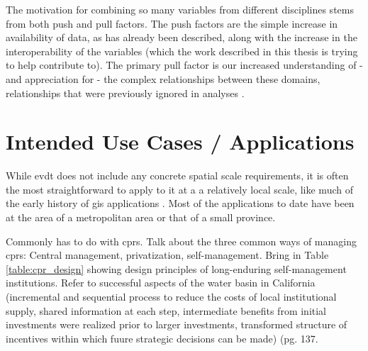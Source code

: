 The motivation for combining so many variables from different disciplines stems from both push and pull factors. The push factors are the simple increase in availability of data, as has already been described, along with the increase in the interoperability of the variables (which the work described in this thesis is trying to help contribute to). The primary pull factor is our increased understanding of - and appreciation for - the complex relationships between these domains, relationships that were previously ignored in analyses \cite{gaheganMultivariateGeovisualization2007}. 

\section{Intended Use Cases / Applications}

While \ac{evdt} does not include any concrete spatial scale requirements, it is often the most straightforward to apply to it at a a relatively local scale, like much of the early history of \ac{gis} applications \cite{tullochInstitutionalGeographicInformation2007}. Most of the applications to date have been at the area of a metropolitan area or that of a small province.





Commonly has to do with \acp{cpr}. Talk about the three common ways of managing \acp{cpr}: Central management, privatization, self-management. Bring in Table \ref{table:cpr_design}  showing design principles of long-enduring self-management institutions. Refer to successful aspects of the water basin in California (incremental and sequential process to reduce the costs of local institutional supply, shared information at each step, intermediate benefits from initial investments were realized prior to larger investments, transformed structure of incentives within which fuure strategic decisions can be made) (pg. 137. \cite{ostromGoverningCommonsEvolution2015}

